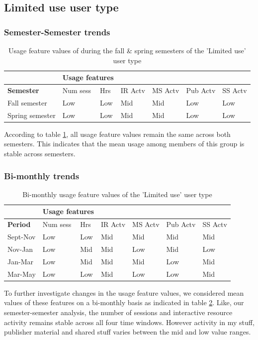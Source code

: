 \documentclass{acm_proc_article-sp}
\begin{document}
\subsection{Limited use user type}
\subsubsection{Semester-Semester trends}
\begin{table}
\caption{Usage feature values of during the fall \& spring semesters of the 'Limited use' user type}
\label{cluster0month}
\begin{tabular}{|p{1.5cm}|p{0.6cm}|p{0.6cm}|p{0.6cm}|p{0.6cm}|p{0.8cm}|p{0.8cm}|}
& \multicolumn{2}{r}{\textbf{Usage features}}  \\ \hline
 \textbf{Semester} & Num sess & Hrs & IR Actv & MS Actv & Pub Actv & SS Actv \\ \hline
 Fall  semester & Low & Low  & Mid & Mid & Low & Low \\ \hline
Spring semester & Low & Low  & Mid & Mid & Low & Low \\ \hline
\end{tabular}
\end{table}
According to table \ref{cluster0month}, all usage feature values remain the same across both semesters. This indicates that the mean usage among members of this group is stable across semesters.
\subsubsection{Bi-monthly trends}
\begin{table}
\caption{Bi-monthly usage feature values of the 'Limited use' user type}
\label{cluster0bimonthly}
\begin{tabular}{|p{1.5cm}|p{0.6cm}|p{0.6cm}|p{0.6cm}|p{0.6cm}|p{0.8cm}|p{0.8cm}|}
& \multicolumn{2}{r}{\textbf{Usage features}}  \\ \hline
 \textbf{Period} 
 & Num sess & Hrs & IR Actv & MS Actv & Pub Actv & SS Actv \\ \hline
Sept-Nov & Low & Low  & Mid & Mid & Mid & Mid \\ \hline
Nov-Jan & Low & Mid  & Mid & Low & Mid & Low \\ \hline
Jan-Mar & Low & Mid  & Mid & Mid & Low & Mid \\ \hline
Mar-May & Low & Low  & Mid & Low & Low & Mid \\ \hline
\end{tabular}
\end{table}
To further investigate changes in the usage feature values, we considered mean values of these features on a bi-monthly basis as indicated in table \ref{cluster0bimonthly}. Like, our semester-semester analysis, the number of sessions and interactive resource activity remains stable across all four time windows.  However activity in my stuff, publisher material and shared stuff  varies between the mid and low value ranges. 
\end{document}
